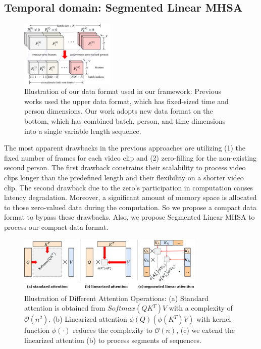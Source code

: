 \documentclass[letterpaper]{article} %
\begin{document}
\subsection{Temporal domain: Segmented Linear MHSA} \label{sec:temp_attn}
\begin{figure}[ht]
    \centering
    \includegraphics[width=0.4\textwidth]{data_format.pdf}
    \caption{Illustration of our data format used in our framework: Previous works used the upper data format, which has fixed-sized time and person dimensions. Our work adopts new data format on the bottom, which has combined batch, person, and time dimensions into a single  variable length sequence.}
    \label{fig:data_format}
\end{figure}

The most apparent drawbacks in the previous approaches \cite{yan2018spatial, 2sagcn2019cvpr} are utilizing (1) the fixed number of frames for each video clip and (2) zero-filling for the non-existing second person. The first drawback constrains their scalability to process video clips longer than the predefined length and their flexibility on a shorter video clip. The second drawback due to the zero's participation in computation causes latency degradation. Moreover, a significant amount of memory space is allocated to those zero-valued data during the computation. So we propose a compact data format to bypass these drawbacks. Also, we propose Segmented Linear MHSA to process our compact data format.

\begin{figure}[ht]
    \centering
    \includegraphics[width=0.8\textwidth]{attn_ops.pdf}
    \caption{Illustration of Different Attention Operations: (a) Standard attention is obtained from $Softmax(QK^T)V$ with a complexity of $\mathcal{O}(n^2)$. (b) Linearized attention $\phi(Q) (\phi(K^T) V)$ with kernel function $\phi(\cdot)$ reduces the complexity to $\mathcal{O}(n)$, (c) we extend the linearized attention (b) to process segments of sequences.}
    \label{fig:attn_ops}
\end{figure}
\end{document}
